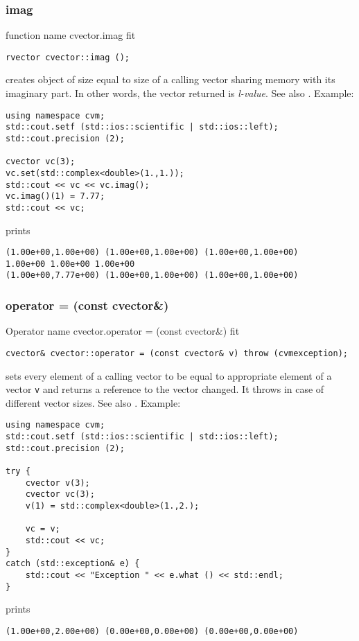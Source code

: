 \subsubsection{imag}
function%
\pdfdest name {cvector.imag} fit
\begin{verbatim}
rvector cvector::imag ();
\end{verbatim}
creates   object
of size equal to  size of a calling vector
sharing  memory with its imaginary part.
In other words, the vector returned is  \emph{l-value}.
See also .
Example:
\begin{Verbatim}
using namespace cvm;
std::cout.setf (std::ios::scientific | std::ios::left);
std::cout.precision (2);

cvector vc(3);
vc.set(std::complex<double>(1.,1.));
std::cout << vc << vc.imag();
vc.imag()(1) = 7.77;
std::cout << vc;
\end{Verbatim}
prints
\begin{Verbatim}
(1.00e+00,1.00e+00) (1.00e+00,1.00e+00) (1.00e+00,1.00e+00)
1.00e+00 1.00e+00 1.00e+00
(1.00e+00,7.77e+00) (1.00e+00,1.00e+00) (1.00e+00,1.00e+00)
\end{Verbatim}
\newpage



\subsubsection{operator = (const cvector\&)}
Operator%
\pdfdest name {cvector.operator = (const cvector&)} fit
\begin{verbatim}
cvector& cvector::operator = (const cvector& v) throw (cvmexception);
\end{verbatim}
sets every element of a calling vector to be equal to
appropriate element of a vector \verb"v"
and returns a reference to
the vector changed.
It throws  
in case of different vector sizes.
See also .
Example:
\begin{Verbatim}
using namespace cvm;
std::cout.setf (std::ios::scientific | std::ios::left);
std::cout.precision (2);

try {
    cvector v(3);
    cvector vc(3);
    v(1) = std::complex<double>(1.,2.);

    vc = v;
    std::cout << vc;
}
catch (std::exception& e) {
    std::cout << "Exception " << e.what () << std::endl;
}
\end{Verbatim}
prints
\begin{Verbatim}
(1.00e+00,2.00e+00) (0.00e+00,0.00e+00) (0.00e+00,0.00e+00)
\end{Verbatim}
\newpage



